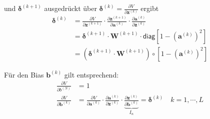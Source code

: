 \documentclass[a4paper, 12pt]{scrartcl}
\begin{document}
\begin{beweis}
    und $\bm{\delta}^{(k+1)}$ ausgedrückt über $\bm{\delta}^{(k)}=\frac{\partial V}{\partial \bm{z}^{(k)}}$ ergibt
    \begin{align*}
        \bm{\delta}^{(k)}
        &=
        \frac{\partial V}{\partial \bm{z}^{(k+1)}}
        \cdot
        \frac{\partial \bm{z}^{(k+1)}}{\partial \bm{a}^{(k)}}
        \cdot
        \frac{\partial \bm{a}^{(k)}}{\partial \bm{z}^{(k)}}
        \\
        &=
        \bm{\delta}^{(k+1)} 
        \cdot 
        \bm{W}^{(k+1)} 
        \cdot
        \mathsf{diag}\left[1- \left(\bm{a}^{(k)}\right)^2 \right]
        \\
        &=
        \left(
            \bm{\delta}^{(k+1)}\cdot \bm{W}^{(k+1)} 
        \right) 
        \circ
        \left[1- \left(\bm{a}^{(k)}\right)^2 \right]
    \end{align*}

    Für den Bias $\bm{b}^{(k)}$ gilt entsprechend: 
    \begin{align*}
        \frac{\partial V}{\partial b^{(N)}}
        &=
        1
        \\
        \frac{\partial V}{\partial \bm{b}^{(k)}}
        &=
        \frac{\partial V}{\partial \bm{a}^{(k)}} 
        \cdot
        \frac{\partial \bm{a}^{(k)}}{\partial \bm{z}^{(k)}}
        \cdot
        \underbrace{
            \frac{\partial \bm{z}^{(k)}}{\partial \bm{b}^{(k)}}
        }_{
            I_n
        }
        =
        \bm{\delta}^{(k)}
        \quad
        k = 1, \cdots , L
    \end{align*}
\end{beweis}

%
\end{document}
